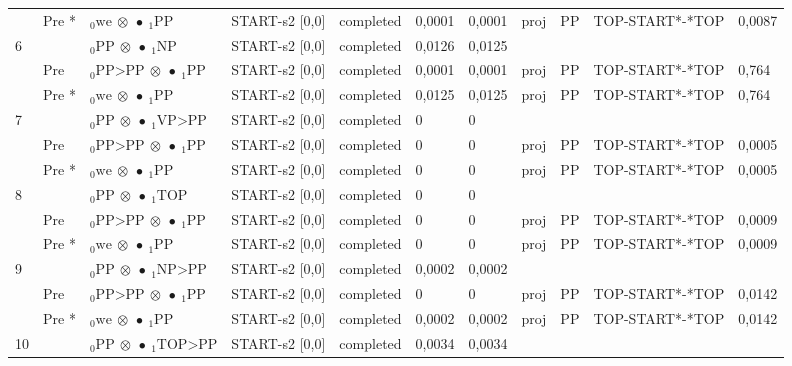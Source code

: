 \documentclass[10pt]{article}
\begin{document}
\begin{longtable}[htbp]{lllllllllll}
 & Pre *& $ {}_0 \textrm{we} \  \otimes \  \bullet \ {}_{1} \textrm{PP} $ & START-s2 [0,0] & completed & 0,0001 & 0,0001 & proj & PP & TOP-START*-*TOP & 0,0087 \\ 
6 & & $ {}_0 \textrm{PP} \  \otimes \  \bullet \ {}_{1} \textrm{NP} $ & START-s2 [0,0] & completed & 0,0126 & 0,0125 & & & & \\ 
 & Pre & $ {}_0 \textrm{PP>PP} \  \otimes \  \bullet \ {}_{1} \textrm{PP} $ & START-s2 [0,0] & completed & 0,0001 & 0,0001 & proj & PP & TOP-START*-*TOP & 0,764 \\ 
 & Pre *& $ {}_0 \textrm{we} \  \otimes \  \bullet \ {}_{1} \textrm{PP} $ & START-s2 [0,0] & completed & 0,0125 & 0,0125 & proj & PP & TOP-START*-*TOP & 0,764 \\ 
7 & & $ {}_0 \textrm{PP} \  \otimes \  \bullet \ {}_{1} \textrm{VP>PP} $ & START-s2 [0,0] & completed & 0 & 0 & & & & \\ 
 & Pre & $ {}_0 \textrm{PP>PP} \  \otimes \  \bullet \ {}_{1} \textrm{PP} $ & START-s2 [0,0] & completed & 0 & 0 & proj & PP & TOP-START*-*TOP & 0,0005 \\ 
 & Pre *& $ {}_0 \textrm{we} \  \otimes \  \bullet \ {}_{1} \textrm{PP} $ & START-s2 [0,0] & completed & 0 & 0 & proj & PP & TOP-START*-*TOP & 0,0005 \\ 
8 & & $ {}_0 \textrm{PP} \  \otimes \  \bullet \ {}_{1} \textrm{TOP} $ & START-s2 [0,0] & completed & 0 & 0 & & & & \\ 
 & Pre & $ {}_0 \textrm{PP>PP} \  \otimes \  \bullet \ {}_{1} \textrm{PP} $ & START-s2 [0,0] & completed & 0 & 0 & proj & PP & TOP-START*-*TOP & 0,0009 \\ 
 & Pre *& $ {}_0 \textrm{we} \  \otimes \  \bullet \ {}_{1} \textrm{PP} $ & START-s2 [0,0] & completed & 0 & 0 & proj & PP & TOP-START*-*TOP & 0,0009 \\ 
9 & & $ {}_0 \textrm{PP} \  \otimes \  \bullet \ {}_{1} \textrm{NP>PP} $ & START-s2 [0,0] & completed & 0,0002 & 0,0002 & & & & \\ 
 & Pre & $ {}_0 \textrm{PP>PP} \  \otimes \  \bullet \ {}_{1} \textrm{PP} $ & START-s2 [0,0] & completed & 0 & 0 & proj & PP & TOP-START*-*TOP & 0,0142 \\ 
 & Pre *& $ {}_0 \textrm{we} \  \otimes \  \bullet \ {}_{1} \textrm{PP} $ & START-s2 [0,0] & completed & 0,0002 & 0,0002 & proj & PP & TOP-START*-*TOP & 0,0142 \\ 
10 & & $ {}_0 \textrm{PP} \  \otimes \  \bullet \ {}_{1} \textrm{TOP>PP} $ & START-s2 [0,0] & completed & 0,0034 & 0,0034 & & & & \\ 

\end{longtable}
\end{document}
